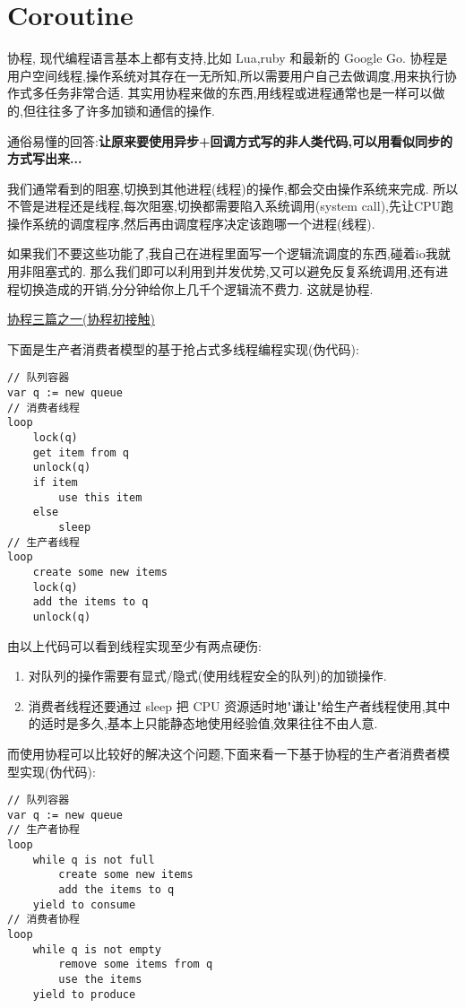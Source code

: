 \chapter{Coroutine}
协程, 现代编程语言基本上都有支持,比如 Lua,ruby 和最新的 Google Go.
协程是用户空间线程,操作系统对其存在一无所知,所以需要用户自己去做调度,用来执行协作式多任务非常合适.
其实用协程来做的东西,用线程或进程通常也是一样可以做的,但往往多了许多加锁和通信的操作.

通俗易懂的回答:\textbf{让原来要使用异步+回调方式写的非人类代码,可以用看似同步的方式写出来...}

我们通常看到的阻塞,切换到其他进程(线程)的操作,都会交由操作系统来完成.
所以不管是进程还是线程,每次阻塞,切换都需要陷入系统调用(system call),先让CPU跑操作系统的调度程序,然后再由调度程序决定该跑哪一个进程(线程).

如果我们不要这些功能了,我自己在进程里面写一个逻辑流调度的东西,碰着io我就用非阻塞式的.
那么我们即可以利用到并发优势,又可以避免反复系统调用,还有进程切换造成的开销,分分钟给你上几千个逻辑流不费力.
这就是协程.


\href{http://blog.csdn.net/gzlaiyonghao/article/details/5397038}{协程三篇之一(协程初接触)}

下面是生产者消费者模型的基于抢占式多线程编程实现(伪代码):
\begin{verbatim}
// 队列容器
var q := new queue
// 消费者线程
loop
    lock(q)
    get item from q
    unlock(q)
    if item
        use this item
    else
        sleep 
// 生产者线程
loop
    create some new items
    lock(q)
    add the items to q
    unlock(q)
\end{verbatim}

由以上代码可以看到线程实现至少有两点硬伤:
\begin{enumerate}
\item 对队列的操作需要有显式/隐式(使用线程安全的队列)的加锁操作.
\item 消费者线程还要通过 sleep 把 CPU 资源适时地"谦让"给生产者线程使用,其中的适时是多久,基本上只能静态地使用经验值,效果往往不由人意.
\end{enumerate}

而使用协程可以比较好的解决这个问题,下面来看一下基于协程的生产者消费者模型实现(伪代码):
\begin{verbatim}
// 队列容器
var q := new queue
// 生产者协程
loop
    while q is not full
        create some new items
        add the items to q
    yield to consume
// 消费者协程
loop
    while q is not empty
        remove some items from q
        use the items
    yield to produce
\end{verbatim}

